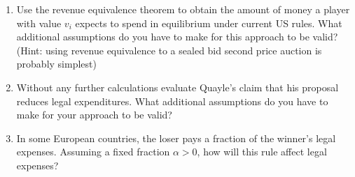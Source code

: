 \documentclass[a4paper,12pt]{article}
\begin{document}
\begin{enumerate}[resume]
  \begin{enumerate}
  \item Use the revenue equivalence theorem to obtain the amount of money a player with value $v_i$ expects to spend in equilibrium under current US rules. What additional assumptions do you have to make for this approach to be valid?\\
    (Hint: using revenue equivalence to a sealed bid second price auction is probably simplest)
  \item Without any further calculations evaluate Quayle's claim that his proposal reduces legal expenditures. What additional assumptions do you have to make for your approach to be valid?
  \item In some European countries, the loser pays a fraction of the winner's legal expenses. Assuming a fixed fraction $\alpha>0$, how will this rule affect legal expenses?
  \end{enumerate}

\end{enumerate}
\end{document}
